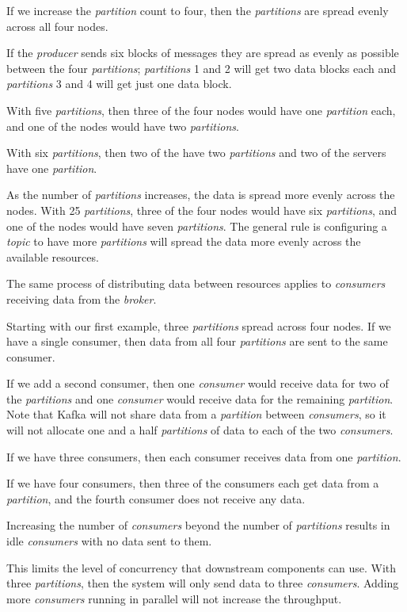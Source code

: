 \documentclass{article}
\newcommand{\kafka} {Kafka\xspace}
\newcommand{\kftopic} {\textit{topic}\xspace}
\newcommand{\kfbroker} {\textit{broker}\xspace}
\newcommand{\kfconsumer} {\textit{consumer}\xspace}
\newcommand{\kfconsumers} {\textit{consumers}\xspace}
\newcommand{\kfproducer} {\textit{producer}\xspace}
\newcommand{\kfpartition} {\textit{partition}\xspace}
\newcommand{\kfpartitions} {\textit{partitions}\xspace}
\begin{document}
If we increase the \kfpartition count to four, then the \kfpartitions are spread evenly across all four nodes.

If the \kfproducer sends six blocks of messages they are spread as evenly as possible between the four \kfpartitions; \kfpartitions 1 and 2 will get two data blocks each and \kfpartitions 3 and 4 will get just one data block.

With five \kfpartitions, then three of the four nodes would have one \kfpartition each, and one of the nodes would have two \kfpartitions.

With six \kfpartitions, then two of the have two \kfpartitions and two of the servers have one \kfpartition.

As the number of \kfpartitions increases, the data is spread more evenly across the nodes.
With 25 \kfpartitions, three of the four nodes would have six
\kfpartitions, and one of the nodes would have seven \kfpartitions.
The general rule is configuring a \kftopic to have more \kfpartitions will spread the data more evenly across the available resources.

The same process of distributing data between resources applies to \kfconsumers receiving data from the \kfbroker.

Starting with our first example, three \kfpartitions spread across four nodes. If we have a single consumer, then data from all four \kfpartitions are sent to the same consumer.

If we add a second consumer, then one \kfconsumer would receive data for two of the \kfpartitions and one \kfconsumer would receive data for the remaining \kfpartition.
Note that \kafka will not share data from a \kfpartition between \kfconsumers, so it will not allocate one and a half \kfpartitions of data to each of the two \kfconsumers.

If we have three consumers, then each consumer receives data from one \kfpartition.

If we have four consumers, then three of the consumers each get data from a \kfpartition, and the fourth consumer does not receive any data.

Increasing the number of \kfconsumers beyond the number of \kfpartitions results in idle \kfconsumers with no data sent to them.

This limits the level of concurrency that downstream components can use. With three \kfpartitions, then the system will only send data to three \kfconsumers.
Adding more \kfconsumers running in parallel will not increase the throughput.
\end{document}
